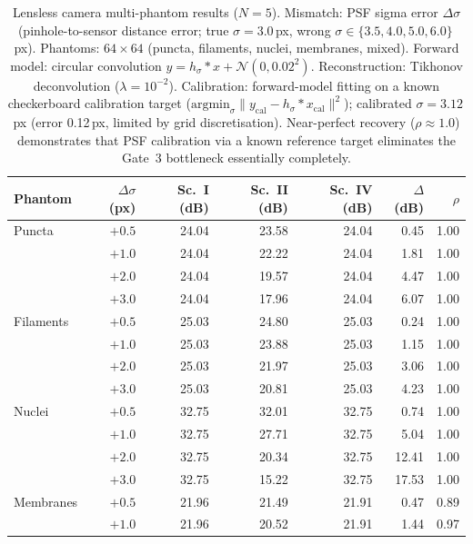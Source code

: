 \documentclass[11pt]{article}
\begin{document}
\begin{table}[htbp]
\centering
\caption{Lensless camera multi-phantom results ($N{=}5$). Mismatch: PSF sigma error $\Delta\sigma$
(pinhole-to-sensor distance error; true $\sigma{=}3.0$\,px, wrong $\sigma \in \{3.5, 4.0, 5.0, 6.0\}$\,px).
Phantoms: $64{\times}64$ (puncta, filaments, nuclei, membranes, mixed).
Forward model: circular convolution $y{=}h_\sigma * x + \mathcal{N}(0, 0.02^2)$.
Reconstruction: Tikhonov deconvolution ($\lambda{=}10^{-2}$).
Calibration: forward-model fitting on a known checkerboard calibration target
($\mathrm{argmin}_{\sigma} \| y_\mathrm{cal} - h_\sigma * x_\mathrm{cal} \|^2$);
calibrated $\sigma{=}3.12$\,px (error 0.12\,px, limited by grid discretisation).
Near-perfect recovery ($\rho{\approx}1.0$) demonstrates that PSF calibration via a known reference target
eliminates the Gate~3 bottleneck essentially completely.}
\label{tab:lensless_scenes}
\small
\begin{tabular}{l r r r r r r}
\toprule
Phantom & $\Delta\sigma$ (px) & Sc.~I (dB) & Sc.~II (dB) & Sc.~IV (dB) & $\Delta$(dB) & $\rho$ \\
\midrule
Puncta       & $+0.5$ & 24.04 & 23.58 & 24.04 &  0.45 & 1.00 \\
             & $+1.0$ & 24.04 & 22.22 & 24.04 &  1.81 & 1.00 \\
             & $+2.0$ & 24.04 & 19.57 & 24.04 &  4.47 & 1.00 \\
             & $+3.0$ & 24.04 & 17.96 & 24.04 &  6.07 & 1.00 \\
Filaments    & $+0.5$ & 25.03 & 24.80 & 25.03 &  0.24 & 1.00 \\
             & $+1.0$ & 25.03 & 23.88 & 25.03 &  1.15 & 1.00 \\
             & $+2.0$ & 25.03 & 21.97 & 25.03 &  3.06 & 1.00 \\
             & $+3.0$ & 25.03 & 20.81 & 25.03 &  4.23 & 1.00 \\
Nuclei       & $+0.5$ & 32.75 & 32.01 & 32.75 &  0.74 & 1.00 \\
             & $+1.0$ & 32.75 & 27.71 & 32.75 &  5.04 & 1.00 \\
             & $+2.0$ & 32.75 & 20.34 & 32.75 & 12.41 & 1.00 \\
             & $+3.0$ & 32.75 & 15.22 & 32.75 & 17.53 & 1.00 \\
Membranes    & $+0.5$ & 21.96 & 21.49 & 21.91 &  0.47 & 0.89 \\
             & $+1.0$ & 21.96 & 20.52 & 21.91 &  1.44 & 0.97 \\

\end{tabular}
\end{table}
\end{document}
